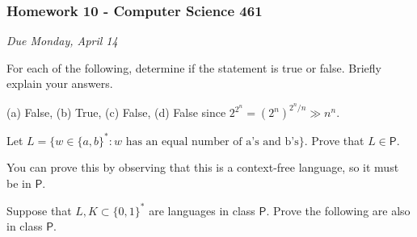 \documentclass[12pt]{exam}
\begin{document}
\pagestyle{empty}
\subsubsection*{Homework 10 - Computer Science 461}
\textit{Due Monday, April 14}

\begin{questions}
\question For each of the following, determine if the statement is true or false.  Briefly explain your answers.
\begin{multicols}{2}
\end{multicols}


\begin{solution}
(a) False, (b) True, (c) False, (d) False since $2^{2^n} = (2^n)^{2^n/n} \gg n^n$. 
\end{solution}
\vspace*{0.5in}


\question Let $L = \{ w \in \{a,b\}^* : w \text{ has an equal number of a's and b's} \}$. Prove that $L \in \mathsf{P}$.  
\begin{solution}
You can prove this by observing that this is a context-free language, so it must be in $\mathsf{P}$. 
\end{solution}
\vfill

\question Suppose that $L, K \subset \{0,1\}^*$ are languages in class $\textsf{P}$.  Prove the following are also in class $\textsf{P}$. 
\end{questions}
\end{document}
